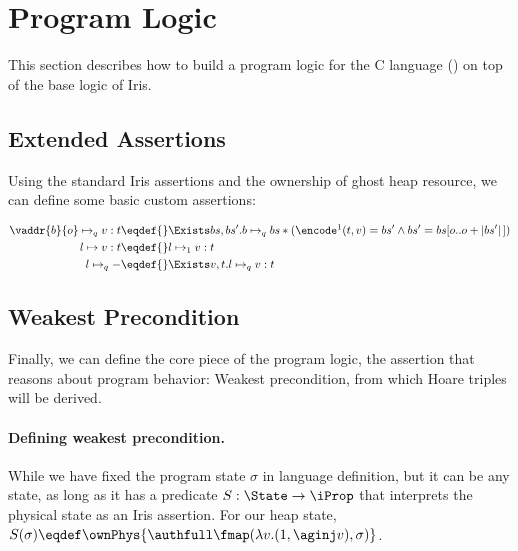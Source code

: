 \section{Program Logic}
\label{sec:program-logic}

This section describes how to build a program logic for the C language (\cf {}) on top of the base logic of Iris.

\subsection{Extended Assertions}

Using the standard Iris assertions and the ownership of ghost heap resource, we can define some basic custom assertions:

\begin{align*}
\vaddr{b}{o} \mapsto_q v : t \eqdef{}& \Exists bs, bs'. b \mapsto_q bs * (\encode \footnotemark (t, v) = bs' \land bs' = bs[o..o + |bs'|\,]) \\
l \mapsto v : t              \eqdef{}& l \mapsto_1 v : t\\
l \mapsto_q -                \eqdef{}& \Exists v, t. l \mapsto_q v : t
\end{align*}

\subsection{Weakest Precondition}

Finally, we can define the core piece of the program logic, the assertion that reasons about program behavior: Weakest precondition, from which Hoare triples will be derived.

\paragraph{Defining weakest precondition.}

While we have fixed the program state $\sigma$ in language definition, but it can be any state, as long as it has a predicate
$S : \State \to \iProp$ that interprets the physical state as an Iris assertion.
For our heap state, $S(\sigma) \eqdef \ownPhys{\authfull \fmap (\lambda v. (1, \aginj v), \sigma)}$.


